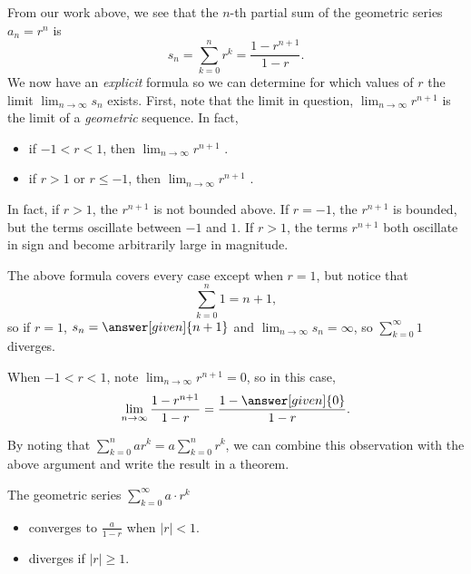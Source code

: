 \documentclass{ximera}
\begin{document}
From our work above, we see that the $n$-th partial sum of the
geometric series $a_n = r^n$ is
\[
s_n = \sum_{k=0}^{n} r^k= \frac{1 - r^{n+1}}{1-r}.
\]
We now have an \emph{explicit} formula so we can determine for which values of $r$ the limit $\lim_{n \to \infty} s_n$ exists.  First, note that the limit in question, $\lim_{n \to \infty} r^{n+1}$ is the limit of a \emph{geometric} sequence.  In fact, 

\begin{itemize}
\item if $-1<r<1$, then $\lim_{n \to \infty} r^{n+1}$ .
\item if $r>1$ or $r\le -1$, then $\lim_{n \to \infty} r^{n+1}$ .
\end{itemize}

In fact, if $r>1$, the $r^{n+1}$ is not bounded above.  If $r=-1$, the $r^{n+1}$ is bounded, but the terms oscillate between $-1$ and $1$.  If $r>1$, the terms $r^{n+1}$ both oscillate in sign and become arbitrarily large in magnitude.

The above formula covers every case except when $r= 1$, but notice that  $$\sum_{k=0}^n 1 = n+1,$$ so if $r=1$, $s_n = \answer[given]{n+1}$ and $\lim_{n \to \infty} s_n = \infty$, so $\sum_{k=0}^{\infty} 1$ diverges. 

When $-1<r<1$, note $\lim_{n \to \infty} r^{n+1}=0$, so in this case,     \[
    \lim_{n\to\infty}\frac{1 - r^{n+1}}{1-r} = \frac{1-\answer[given]{0}}{1-r}.
    \]

By noting that $\sum_{k=0}^n ar^k = a \sum_{k=0}^n r^k$, we can combine this observation with the above argument and write the result in a theorem.

\begin{theorem}
  The geometric series $\sum_{k= 0}^\infty a \cdot r^k$ 
  
  \begin{itemize} 
  \item converges to $\frac{a}{1-r}$ when $|r| < 1$.
  \item diverges if $|r| \geq 1$.  
  \end{itemize}
  \end{theorem}
\end{document}
